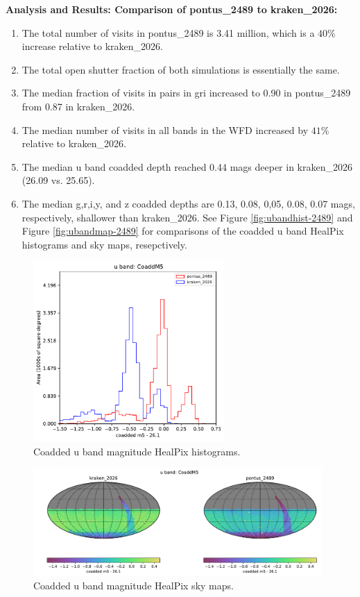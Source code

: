 \documentclass[DM,lsstdraft,authoryear,toc]{lsstdoc}
\begin{document}
\textbf{Analysis and Results: Comparison of pontus\_2489 to kraken\_2026:}

\begin{enumerate}
\item The total number of visits in pontus\_2489 is 3.41 million, which is a $40\%$ increase relative to kraken\_2026.
\item The total open shutter fraction of both simulations is essentially the same.
\item The median fraction of visits in pairs in gri increased to 0.90 in pontus\_2489 from 0.87 in kraken\_2026.
\item The median number of visits in all bands in the WFD increased by $41\%$ relative to kraken\_2026.
\item The median u band coadded depth reached 0.44 mags deeper in kraken\_2026 (26.09 vs. 25.65). 
\item  The median g,r,i,y, and z coadded depths are 0.13, 0.08, 0,05, 0.08, 0.07 mags, respectively, shallower than kraken\_2026.
See Figure  \autoref{fig:ubandhist-2489} and Figure  \autoref{fig:ubandmap-2489} for comparisons of the coadded u band
HealPix histograms and sky maps, resepctively.
\end{enumerate}

\begin{figure}[ht]
\centering
\includegraphics[width=0.65\textwidth]{figures/pontus_2489_kraken_2026_CoaddM5_u_band_HEAL_ComboHistogram.pdf}
\caption{Coadded u band magnitude HealPix histograms.}
\label{fig:ubandhist-2489}
\end{figure}

\begin{figure}[ht]
\centering
\includegraphics[width=0.98\textwidth]{figures/pontus_2489_kraken_2026_CoaddM5_u_band_HEAL_ComboSkyMap.pdf} 
\caption{Coadded u band magnitude HealPix sky maps.}
\label{fig:ubandmap-2489}
\end{figure}
\end{document}
